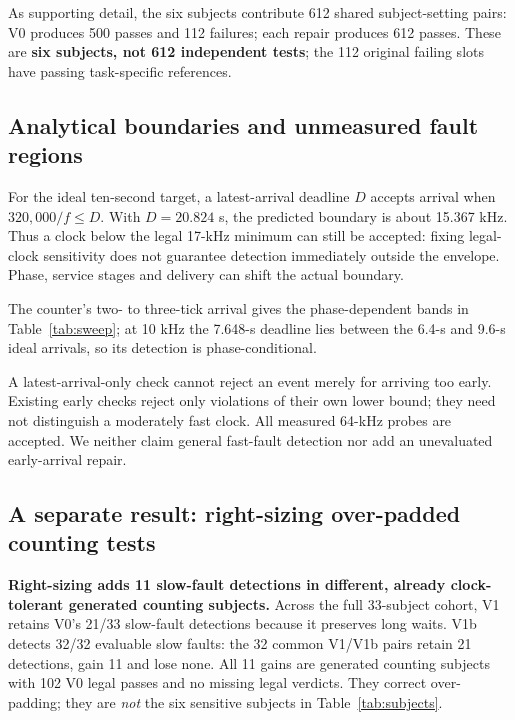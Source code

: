 \documentclass[sigconf,nonacm,balance=false]{acmart}
\begin{document}
As supporting detail, the six subjects contribute 612 shared subject-setting pairs: V0 produces 500 passes and 112 failures; each repair produces 612 passes. These are \textbf{six subjects, not 612 independent tests}; the 112 original failing slots have passing task-specific references.

\subsection{Analytical boundaries and unmeasured fault regions}
For the ideal ten-second target, a latest-arrival deadline $D$ accepts arrival when $320{,}000/f\leq D$. With $D=20.824$ s, the predicted boundary is about 15.367 kHz. Thus a clock below the legal 17-kHz minimum can still be accepted: fixing legal-clock sensitivity does not guarantee detection immediately outside the envelope. Phase, service stages and delivery can shift the actual boundary.

The counter's two- to three-tick arrival gives the phase-dependent bands in Table~\ref{tab:sweep}; at 10 kHz the 7.648-s deadline lies between the 6.4-s and 9.6-s ideal arrivals, so its detection is phase-conditional.

A latest-arrival-only check cannot reject an event merely for arriving too early. Existing early checks reject only violations of their own lower bound; they need not distinguish a moderately fast clock. All measured 64-kHz probes are accepted. We neither claim general fast-fault detection nor add an unevaluated early-arrival repair.

\subsection{A separate result: right-sizing over-padded counting tests}
\textbf{Right-sizing adds 11 slow-fault detections in different, already clock-tolerant generated counting subjects.} Across the full 33-subject cohort, V1 retains V0's 21/33 slow-fault detections because it preserves long waits. V1b detects 32/32 evaluable slow faults: the 32 common V1/V1b pairs retain 21 detections, gain 11 and lose none. All 11 gains are generated counting subjects with 102 V0 legal passes and no missing legal verdicts. They correct over-padding; they are \emph{not} the six sensitive subjects in Table~\ref{tab:subjects}.

\begin{table}[t]
\caption{Full 33-subject cohort. Seed F/M: failures/missing out of 3,300 slots. Fault cells: detections/evaluable. Callback duration is reported separately in the text.}
\label{tab:repairs}\small\centering\setlength{\tabcolsep}{3pt}

\end{table}
\end{document}
